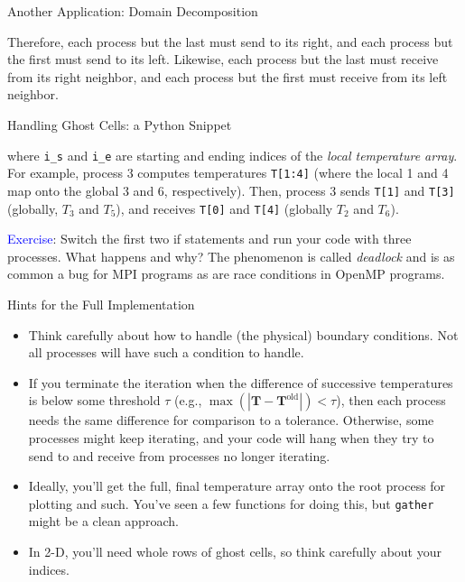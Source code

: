 \documentclass[10pt,handout]{beamer}
\begin{document}
\begin{frame}{Another Application: Domain Decomposition}
\begin{center}
\begin{tikzpicture}
\end{tikzpicture}
\end{center}
 
\vfill 

Therefore, each process but the last must send to its right, and
each process but the first must send to its left.
\vfill 
Likewise, each process but the last must receive from its right
neighbor, and each process but the first must receive from its
left neighbor.

\end{frame}

\begin{frame}{Handling Ghost Cells: a Python Snippet}




where {\tt i\_s} and {\tt i\_e} are starting and ending indices
of the {\it local temperature array}.
For example, process 3 computes temperatures {\tt T[1:4]}
(where the local 1 and 4 map onto the global 3 and 6, respectively).  Then,
process 3 sends
{\tt T[1]} and {\tt T[3]} (globally, 
$T_3$ and $T_5$), and receives 
{\tt T[0]} and {\tt T[4]} (globally $T_2$ and $T_6$).

\vfill 

\textcolor{blue}{Exercise}: 
Switch the first two if statements and run your code with three 
processes.  What happens and why?  The phenomenon is called 
{\it deadlock} and is as common a bug for MPI programs as are 
race conditions in OpenMP programs.

\end{frame}

\begin{frame}{Hints for the Full Implementation}


\begin{itemize}
 \item Think carefully about how to handle (the physical) boundary conditions.
       Not all processes will have such a condition to handle.
 \item If you terminate the iteration when the difference of successive 
       temperatures is below some threshold $\tau$
       (e.g., $\max(|\mathbf{T} - \mathbf{T}^{\text{old}}|) < \tau$), then each
       process needs the same difference for comparison to a tolerance.  Otherwise,
       some processes might keep iterating, and your code will hang when 
       they try to send to and receive from processes no longer iterating.
 \item Ideally, you'll get the full, final temperature array onto the root 
       process for plotting and such.  You've seen a few functions for 
       doing this, but {\tt gather} might be a clean approach.
 \item In 2-D, you'll need whole rows of ghost cells, so think carefully about 
       your indices.
\end{itemize}


\end{frame}
\end{document}
